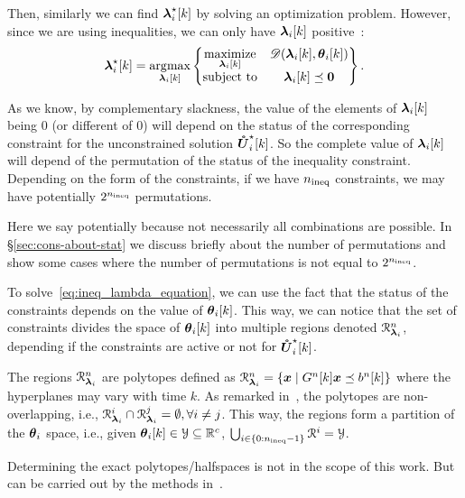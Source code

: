 \documentclass[../main.tex]{subfiles}
\begin{document}
Then, similarly we can find $\lambdaikstar$ by solving an optimization problem.
However, since we are using inequalities, we can only have $\lambdaik$ positive~\cite{BoydVandenberghe2004}:
\begin{equation}
  \label{eq:ineq_lambda_equation}
  \begin{matrix}
    \lambdaikstar=\argmax\limits_{\lambdaik}\left\{
    \begin{matrix}
      \maximize\limits_{\lambdaik}&\dualfunction\\
      \mathrm{subject~ to}& \lambdaik\preceq\0
    \end{matrix}\right\}.
  \end{matrix}
\end{equation}

As we know, by complementary slackness, the value of the elements of $\lambdaik$ being $0$ (or different of $0$) will depend on the status of the corresponding constraint for the unconstrained solution $\optuncUik$.
So the complete value of $\lambdaik$ will depend of the permutation of the status of the inequality constraint.
Depending on the form of the constraints, if we have $n_{\text{ineq}}$ constraints, we may have potentially $2^{n_{\text{ineq}}}$ permutations.
\begin{remark}
  Here we say potentially because not necessarily all combinations are possible.
  In \S\ref{sec:cons-about-stat} we discuss briefly about the number of permutations and show some cases where the number of permutations is not equal to $2^{n_{\text{ineq}}}$.
\end{remark}

To solve~\eqref{eq:ineq_lambda_equation}, we can use the fact that the status of the constraints depends on the value of $\thetaik$.
This way, we can notice that the set of constraints divides the space of $\thetaik$ into multiple regions denoted $\mathcal{R}_{\boldsymbol{\lambda}_i}^{n}$, depending if the constraints are active or not for $\optuncUik$.

The regions $\mathcal{R}_{\boldsymbol{\lambda}_i}^{n}$ are polytopes defined as ${\mathcal{R}_{\boldsymbol{\lambda}_i}^{n}=\{\boldsymbol{x}\mid G^{n}[k]\boldsymbol{x} \preceq b^{n}[k]\}}$ where the hyperplanes may vary with time $k$.
As remarked in~\cite{BemporadEtAl2002}, the polytopes are non-overlapping, i.e., ${\mathcal{R}_{\boldsymbol{\lambda}_i}^{i}\cap\mathcal{R}_{\boldsymbol{\lambda}_i}^{j}=\emptyset, \forall i\neq j}$.
This way, the regions form a partition of the $\boldsymbol{\theta}_i$ space, i.e., given $\thetaik\in\set{Y}\subseteq\R^{c}$, ${\bigcup_{i\in\{0:n_{\text{ineq}}-1\}}\mathcal{R}^{i}=\mathcal{Y}}$.
\begin{remark}
  Determining the exact polytopes/halfspaces is not in the scope of this work.
  But can be carried out by the methods in~\cite[\S4.1.3.2]{LauerBloch2019}.
\end{remark}
\end{document}
